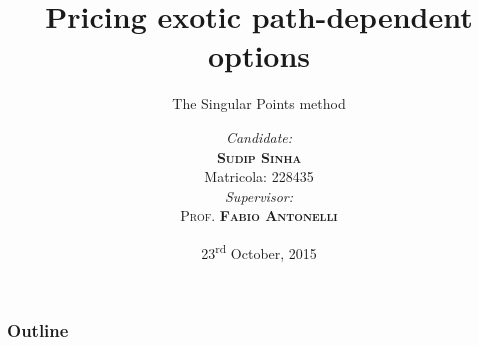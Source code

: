 \documentclass[utf8,t,xcolor=svgnames]{beamer}
\begin{document}

\title{Pricing exotic path-dependent options}
\subtitle{The Singular Points method}
\date[2015-10-23]{23\textsuperscript{rd} October, 2015}
\author{
	\begin{minipage}[t]{0.4\textwidth}
		\begin{center}
			{\small \emph{Candidate:}}\\
			{\textbf{\textsc{Sudip Sinha}}}\\
			{\small Matricola: 228435}
		\end{center}
	\end{minipage}
	\begin{minipage}[t]{0.5\textwidth}
		\begin{center}
			\emph{Supervisor:} \\
			\textsc{Prof. \textbf{Fabio Antonelli}}
		\end{center}
	\end{minipage}
	}


\begin{frame}[plain]
	\maketitle
\end{frame}

\begin{frame}
	\frametitle{Outline}
	\tableofcontents
\end{frame}
\end{document}
